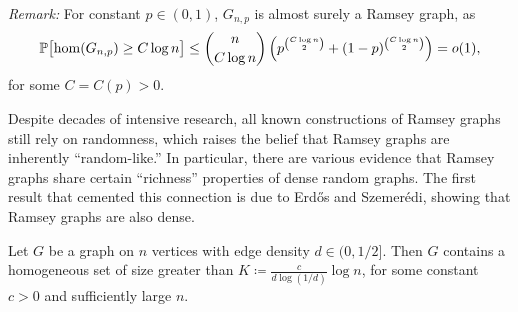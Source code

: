 \textit{Remark: } For constant $p \in (0, 1)$, $G_{n, p}$ is almost surely a Ramsey graph, as
\[
  \mathbb{P}\bigl[\hom(G_{n, p}) \geq C\log n\bigr] \leq \binom{n}{C\log n}\left(p^{\binom{C\log n}{2}} + (1 - p)^{\binom{C\log n}{2}}\right) = o(1),
\]
for some $C = C(p) > 0$. 

Despite decades of intensive research, all known constructions of Ramsey graphs still rely on randomness, which raises the belief that Ramsey graphs are inherently ``random-like.'' In particular, there are various evidence that Ramsey graphs share certain ``richness'' properties of dense random graphs. The first result that cemented this connection is due to Erd\H{o}s and Szemer\'{e}di, showing that Ramsey graphs are also dense.

\begin{theorem}
  \label{thm:ramsey-density}

  Let $G$ be a graph on $n$ vertices with edge density $d \in (0, 1/2]$. Then $G$ contains a homogeneous set of size greater than $K \coloneqq \frac{c}{d\log(1/d)} \log n$, for some constant $c > 0$ and sufficiently large $n$.
\end{theorem}

